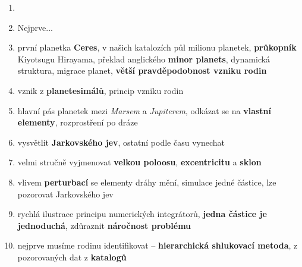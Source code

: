 \documentclass[a4paper, 12pt]{article}
\begin{document}
\Large
\begin{enumerate}[wide, label=\arabic*/21]
\item 
{}
\item Nejprve...
\item první planetka \textbf{Ceres}, v našich katalozích půl milionu planetek, \textbf{průkopník} Kiyotsugu Hirayama, překlad anglického \textbf{minor planets}, dynamická struktura, migrace planet, \textbf{větší pravděpodobnost vzniku rodin}
\item vznik z \textbf{planetesimálů}, princip vzniku rodin
\item hlavní pás planetek mezi \textit{Marsem} a \textit{Jupiterem}, odkázat se na \textbf{vlastní elementy}, rozprostření po dráze
\item vysvětlit \textbf{Jarkovského jev}, ostatní podle času vynechat 
\item velmi stručně vyjmenovat \textbf{velkou poloosu}, \textbf{excentricitu} a \textbf{sklon}
\item vlivem \textbf{perturbací} se elementy dráhy mění, simulace jedné částice, lze pozorovat Jarkovského jev
\item rychlá ilustrace principu numerických integrátorů, \textbf{jedna částice je jednoduchá}, zdůraznit \textbf{náročnost problému}
\item nejprve musíme rodinu identifikovat -- \textbf{hierarchická shlukovací metoda}, z pozorovaných dat z \textbf{katalogů}

\


\end{enumerate}
\end{document}
